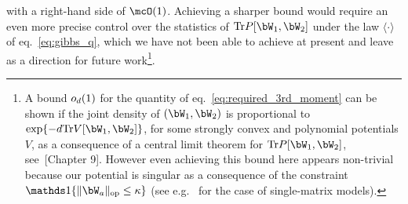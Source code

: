 \begin{itemize}[leftmargin=*]
    with a right-hand side of $\mcO(1)$.
    Achieving a sharper bound would require an even more precise control over the statistics of
    $\Tr P[\bW_1, \bW_2]$
    under the law $\langle \cdot \rangle$ of eq.~\eqref{eq:gibbs_q}, 
    which we have not been able to achieve at present and leave as a direction for future work\footnote{
     A bound $o_d(1)$ for the quantity of eq.~\eqref{eq:required_3rd_moment} can be shown if the joint density of $(\bW_1, \bW_2)$ is proportional to $\exp\{-d \Tr V[\bW_1, \bW_2]\}$, for some strongly convex and polynomial potentials $V$, as a consequence 
     of a central limit theorem for $\Tr P[\bW_1,\bW_2]$, see~\cite{guionnet2009large}[Chapter 9]. However even achieving this bound here appears non-trivial because our potential is singular as a consequence of the constraint $\indi\{\|\bW_a\|_\op \leq \kappa\}$ (see e.g.~\cite{borot2013asymptotic} for the case of single-matrix models).
    }.
\end{itemize}

